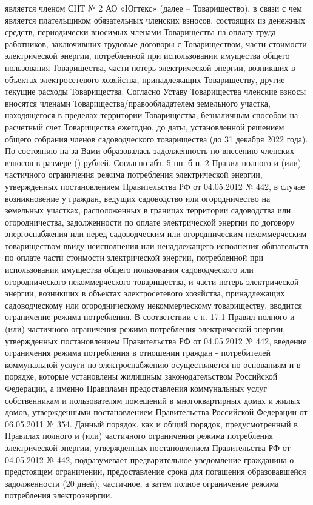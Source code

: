  является членом СНТ № 2 АО «Югтекс» (далее – Товарищество), в связи с чем является плательщиком обязательных членских взносов, состоящих из денежных средств, периодически вносимых членами Товарищества на оплату труда работников, заключивших трудовые договоры с Товариществом, части стоимости электрической энергии, потребленной при использовании имущества общего пользования Товарищества, части потерь электрической энергии, возникших в объектах электросетевого хозяйства, принадлежащих Товариществу, другие текущие расходы Товарищества. 
Согласно Уставу Товарищества членские взносы вносятся членами Товарищества/правообладателем земельного участка, находящегося в пределах территории Товарищества, безналичным способом на расчетный счет Товарищества ежегодно, до даты, установленной решением общего собрания членов садоводческого товарищества    (до 31  декабря 2022 года).
По состоянию на  за Вами образовалась задолженность по внесению членских взносов в размере  ()  рублей.
Согласно абз. 5 пп. б п. 2 Правил полного и (или) частичного ограничения режима потребления электрической энергии, утвержденных постановлением Правительства РФ от 04.05.2012 № 442, в случае возникновение у граждан, ведущих садоводство или огородничество на земельных участках, расположенных в границах территории садоводства или огородничества, задолженности по оплате электрической энергии по договору энергоснабжения или перед садоводческим или огородническим некоммерческим товариществом ввиду неисполнения или ненадлежащего исполнения обязательств по оплате части стоимости электрической энергии, потребленной при использовании имущества общего пользования садоводческого или огороднического некоммерческого товарищества, и части потерь электрической энергии, возникших в объектах электросетевого хозяйства, принадлежащих садоводческому или огородническому некоммерческому товариществу, вводится ограничение режима потребления.
В соответствии с п. 17.1 Правил полного и (или) частичного ограничения режима потребления электрической энергии, утвержденных постановлением Правительства РФ от 04.05.2012 № 442, введение ограничения режима потребления в отношении граждан - потребителей коммунальной услуги по электроснабжению осуществляется по основаниям и в порядке, которые установлены жилищным законодательством Российской Федерации, а именно Правилами предоставления коммунальных услуг собственникам и пользователям помещений в многоквартирных домах и жилых домов, утвержденными постановлением Правительства Российской Федерации от 06.05.2011 № 354.
Данный порядок, как и общий порядок, предусмотренный в Правилах полного и (или) частичного ограничения режима потребления электрической энергии, утвержденных постановлением Правительства РФ от 04.05.2012 № 442, подразумевает предварительное уведомление гражданина о предстоящем ограничении, предоставление срока для погашения образовавшейся задолженности (20 дней), частичное, а затем полное ограничение режима потребления электроэнергии. 
